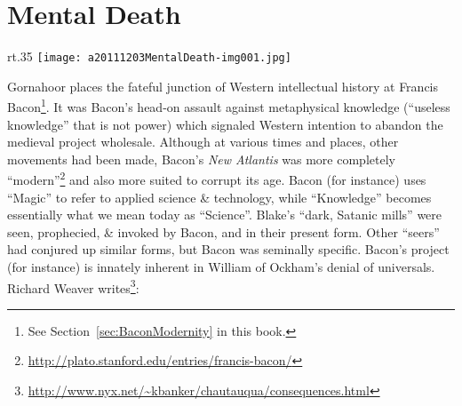 \section{Mental Death}

\begin{wrapfigure}{rt}{.35\textwidth}
\texttt{[image: a20111203MentalDeath-img001.jpg]}
\end{wrapfigure}
Gornahoor places the fateful junction of Western intellectual history at Francis Bacon\footnote{See Section~\ref{sec:BaconModernity} in this book.}. It was Bacon's head-on assault against metaphysical knowledge (``useless knowledge'' that is not power) which signaled Western intention to abandon the medieval project wholesale. Although at various times and places, other movements had been made, Bacon's \emph{New Atlantis} was more completely ``modern''\footnote{\url{http://plato.stanford.edu/entries/francis-bacon/}} and also more suited to corrupt its age. Bacon (for instance) uses ``Magic'' to refer to applied science \& technology, while ``Knowledge'' becomes essentially what we mean today as ``Science''. Blake's ``dark, Satanic mills'' were seen, prophecied, \& invoked by Bacon, and in their present form. Other ``seers'' had conjured up similar forms, but Bacon was seminally specific. Bacon's project (for instance) is innately inherent in William of Ockham's denial of universals. Richard Weaver writes\footnote{\url{http://www.nyx.net/~kbanker/chautauqua/consequences.html}}:

